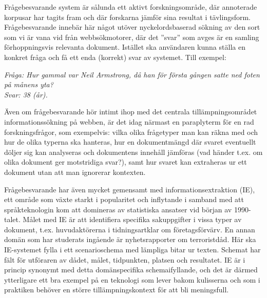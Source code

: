 \begin{multicols}{2}

Frågebesvarande system är sålunda ett aktivt forskningsområde, där
annoterade korpusar har tagits fram och där forskarna jämför sina
resultat i tävlingsform. Frågebesvarande innebär här något utöver
nyckelordsbaserad sökning av den sort som vi är vana vid från
webbsökmotorer, där det ''svar'' som avges är en samling
förhoppningsvis relevanta dokument. Istället ska användaren kunna
ställa en konkret fråga och få ett enda (korrekt) svar av
systemet. Till exempel:

\textit{Fråga: Hur gammal var Neil Armstrong, då han för första gången satte ned foten på månens yta?}\\
\textit{Svar: 38 (år).}

Även om frågebesvarande hör intimt ihop med det centrala
tillämpningsområdet informationssökning på webben, är det idag närmast
en paraplyterm för en rad forskningsfrågor, som exempelvis: vilka
olika frågetyper man kan räkna med och hur de olika typerna ska
hanteras, hur en dokumentmängd där svaret eventuellt döljer sig kan
analyseras och dokumentens innehåll jämföras (vad händer t.ex. om
olika dokument ger motstridiga svar?), samt hur svaret kan extraheras
ur ett dokument utan att man ignorerar kontexten.

Frågebesvarande har även mycket gemensamt med
in\-forma\-tions\-ex\-trak\-tion (IE), ett område som växte starkt i
popularitet och inflytande i samband med att språkteknologin kom att
domineras av statistiska ansatser vid början av 1990-talet. Målet med
IE är att identifiera specifika sakuppgifter i vissa typer av
dokument, t.ex. huvudaktörerna i tidningsartklar om
företagsförvärv. En annan domän som har studerats ingående är
nyhetsrapporter om terroristdåd. Här ska IE-systemet fylla i ett
scenarioschema med lämpliga bitar ur texten. Schemat har fält för
utföraren av dådet, målet, tidpunkten, platsen och resultatet. IE är i
princip synonymt med detta domänspecifika schemaifyllande, och det är
därmed ytterligare ett bra exempel på en teknologi som lever bakom
kulisserna och som i praktiken behöver en större tillämpningskontext
för att bli meningsfull.


\end{multicols}
